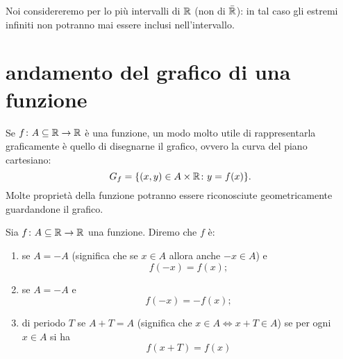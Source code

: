 Noi considereremo per lo più intervalli di ${\mathbb R}$ (non di $\bar {{\mathbb R}}$): in tal
caso gli estremi infiniti non potranno mai essere inclusi nell'intervallo.


\section{andamento del grafico di una funzione}
%
Se $f\colon A \subseteq {\mathbb R}\to {\mathbb R}$ è una funzione, un modo molto
utile di rappresentarla graficamente è quello di disegnarne il
grafico, ovvero la curva del piano cartesiano:
\[
   G_f = {\left\{ (x,y)\in A\times {\mathbb R}\colon y = f(x) \right\}}.
\]
Molte proprietà della funzione potranno essere riconosciute
geometricamente guardandone il grafico.

\begin{definition}[simmetrie]
Sia $f\colon A \subseteq {\mathbb R} \to {\mathbb R}$ una funzione.
Diremo che $f$ è:
\begin{enumerate}
\item {}
%
se $A=-A$ (significa che se $x\in A$ allora anche $-x\in A$) e
\[
  f(-x) = f(x);
\]
\item {}
%
se $A=-A$ e
\[
  f(-x) = -f(x);
\]
\item {}
%
di periodo $T$ se $A+T=A$
(significa che $x\in A \iff x+T \in A$)
se per ogni $x\in A$ si ha
\[
  f(x+T)=f(x)
\]
\end{enumerate}
\end{definition}

